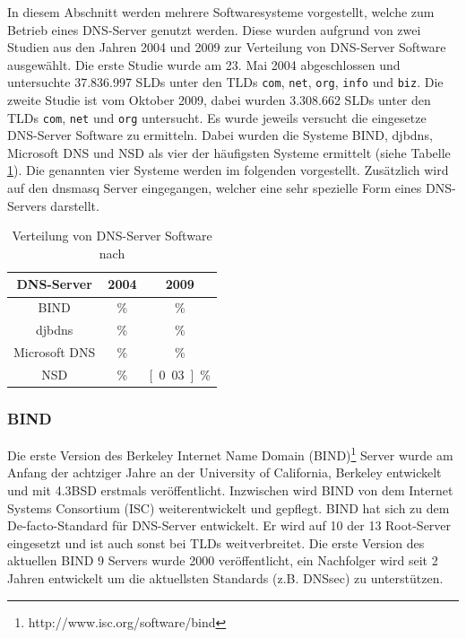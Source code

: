 \documentclass[a4paper, 12pt, BCOR10mm, DIV12, toc=bibliography, toc=listof, german]{scrbook}
\begin{document}
				In diesem Abschnitt werden mehrere Softwaresysteme vorgestellt, welche zum Betrieb eines
				DNS-Server genutzt werden. Diese wurden aufgrund von zwei Studien aus den Jahren 2004 und
				2009 zur Verteilung von DNS-Server Software ausgewählt. Die erste Studie \cite{survey2004}
				wurde am 23. Mai 2004 abgeschlossen und untersuchte 37.836.997 SLDs unter den TLDs
				\texttt{com}, \texttt{net}, \texttt{org},	\texttt{info} und \texttt{biz}. Die zweite Studie
				\cite{survey2009} ist vom Oktober 2009, dabei wurden 3.308.662 SLDs unter den TLDs
				\texttt{com}, \texttt{net} und \texttt{org} untersucht. Es wurde jeweils versucht die
				eingesetze DNS-Server Software zu ermitteln. Dabei wurden die Systeme BIND, djbdns,
				Microsoft DNS und NSD als vier der häufigsten Systeme ermittelt (siehe Tabelle
				\ref{tab:verteilung}). Die genannten vier Systeme werden im folgenden vorgestellt.
				Zusätzlich wird auf den dnsmasq Server eingegangen, welcher eine sehr spezielle Form eines
				DNS-Servers darstellt.
				
				\begin{table}
					\centering
					\begin{tabular}{|c|c|c|}\hline
						DNS-Server & 2004 & 2009 \\\hline\hline
						BIND & \unit[70,11]{\%} & \unit[73,85]{\%} \\
						djbdns & \unit[15,57]{\%} & \unit[2,56]{\%} \\
						Microsoft DNS & \unit[6,24]{\%} & \unit[0,26]{\%}\\
						NSD & \unit[0,20]{\%} & \unit[0.03]{\%} \\\hline
					\end{tabular}
					\caption{Verteilung von DNS-Server Software nach \cite{survey2004, survey2009}}
					\label{tab:verteilung}
				\end{table}

				\subsubsection*{BIND} %

				Die erste Version des Berkeley Internet Name Domain
				(BIND)\footnote{http://www.isc.org/software/bind} Server wurde am Anfang der achtziger Jahre
				an der University of California, Berkeley entwickelt und mit 4.3BSD erstmals
				veröffentlicht. Inzwischen wird BIND von dem Internet Systems Consortium (ISC)
				weiterentwickelt und gepflegt. BIND hat sich zu dem De-facto-Standard für DNS-Server
				entwickelt. Er wird auf 10 der 13 Root-Server eingesetzt und ist auch sonst bei TLDs
				weitverbreitet. Die erste Version des aktuellen BIND 9 Servers wurde 2000 veröffentlicht,
				ein Nachfolger wird seit 2 Jahren entwickelt um die aktuellsten Standards (z.B.  DNSsec) zu
				unterstützen.
\end{document}
